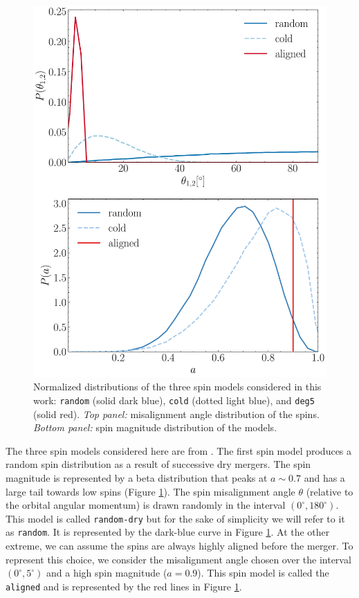 \documentclass[11pt, letterpaper]{article}
\begin{document}
\begin{figure}[htb!]
    \centering
    \includegraphics[scale=0.45]{fig/spin-models-magnitude-and-angle.pdf}
    \caption{Normalized distributions of the three spin models considered in this work: \texttt{random} (solid dark blue), \texttt{cold} (dotted light blue), and \texttt{deg5} (solid red). \textit{Top panel:} misalignment angle distribution of the spins. \textit{Bottom panel:} spin magnitude distribution of the models.}
    \label{fig:spin-dist}
\end{figure}


The three spin models considered here are from \cite{Blecha2016}. The first spin model produces a random spin distribution as a result of successive dry mergers. The spin magnitude is represented by a beta distribution that peaks at $a \sim 0.7$ \citep{Lousto_2012} and has a large tail towards low spins (Figure \ref{fig:spin-dist}). The spin misalignment angle $\theta$ (relative to the orbital angular momentum) is drawn randomly in the interval $(0^{\circ},180^{\circ})$. This model is called \texttt{random-dry} but for the sake of simplicity we will refer to it as \texttt{random}. It is represented by the dark-blue curve in Figure \ref{fig:spin-dist}. At the other extreme, we can assume the spins are always highly aligned before the merger. To represent this choice, we consider the misalignment angle chosen over the interval $(0^{\circ},5^{\circ})$ and a high spin magnitude ($a = 0.9$). This spin model is called the \texttt{aligned} and is represented by the red lines in Figure \ref{fig:spin-dist}.
\end{document}
